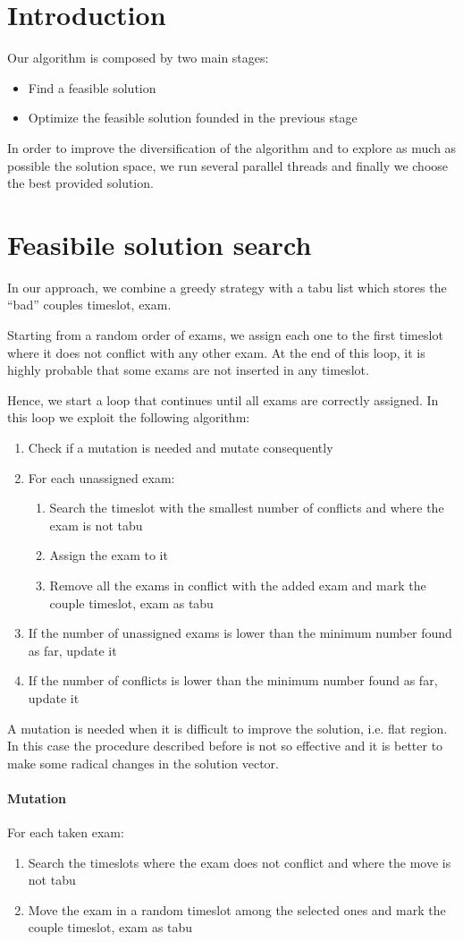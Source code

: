 \section*{Introduction}
Our algorithm is composed by two main stages:
\begin{itemize}
\item Find a feasible solution
\item Optimize the feasible solution founded in the previous stage
\end{itemize}

In order to improve the diversification of the algorithm and to explore as much as possible the solution space, we run several parallel threads and finally we choose the best provided solution.

\section*{Feasibile solution search}
In our approach, we combine a greedy strategy with a tabu list which stores the ``bad'' couples timeslot, exam.

Starting from a random order of exams, we assign each one to the first timeslot where it does not conflict with any other exam. At the end of this loop, it is highly probable that some exams are not inserted in any timeslot.

Hence, we start a loop that continues until all exams are correctly assigned. In this loop we exploit the following algorithm:
\begin{enumerate}
\item Check if a mutation is needed and mutate consequently
\item For each unassigned exam:
\begin{enumerate}
\item Search the timeslot with the smallest number of conflicts and where the exam is not tabu
\item Assign the exam to it
\item Remove all the exams in conflict with the added exam and mark the couple timeslot, exam as tabu
\end{enumerate} 
\item If the number of unassigned exams is lower than the minimum number found as far, update it
\item If the number of conflicts is lower than the minimum number found as far, update it
\end{enumerate}
A mutation is needed when it is difficult to improve the solution, i.e. flat region. In this case the procedure described before is not so effective and it is better to make some radical changes in the solution vector.
\paragraph*{Mutation}
For each taken exam:
\begin{enumerate}
\item Search the timeslots where the exam does not conflict and where the move is not tabu
\item Move the exam in a random timeslot among the selected ones and mark the couple timeslot, exam as tabu
\end{enumerate}